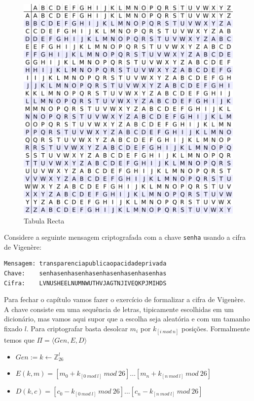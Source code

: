 \begin{figure}[htbp]
  \centering
  \includegraphics[width=.8\textwidth]{imagens/tabula-recta.png}
  \caption{Tabula Recta}
  \label{fig:tabula-recta}
\end{figure}


\begin{example}
  Considere a seguinte mensagem criptografada com a chave {\tt senha} usando a cifra de Vigenère:

\begin{verbatim}
Mensagem: transparenciapublicaopacidadeprivada
Chave:    senhasenhasenhasenhasenhasenhasenhas
Cifra:    LVNUSHEELNUMNWUTHVJAGTNJIVEQKPJMIHDS
\end{verbatim}
\end{example}

Para fechar o capítulo vamos fazer o exercício de formalizar a cifra de Vigenère.
A chave consiste em uma sequência de letras, tipicamente escolhidas em um dicionário, mas vamos aqui supor que a escolha seja aleatória e com um tamanho fixado $l$.
Para criptografar basta desolcar $m_i$ por $k_{[i\ mod\ n]}$ posições.
Formalmente temos que $\Pi = \langle Gen, E, D \rangle$

\begin{itemize}
\item $Gen := k \leftarrow \mathbb{Z}_{26}^l$
\item $E(k, m) = [m_0 + k_{[0\ mod\ l]}\ mod\ 26] \dots [m_n + k_{[n\ mod\ l]}\ mod\ 26]$
\item $D(k, c) = [c_0 - k_{[0\ mod\ l]}\ mod\ 26] \dots [c_n - k_{[n\ mod\ l]}\ mod\ 26]$
\end{itemize}

